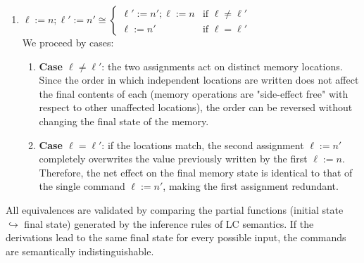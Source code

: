 \begin{solution}
\begin{enumerate}[label=(\alph*)]
    \begin{enumerate}[label=(\alph{enumi}).\arabic*]
        \item \textbf{$B$ is evaluated to $false$}: the loop terminates immediately in state $s$ ($\langle \text{while } B \text{ do } C, s \rangle\Downarrow \langle skip,s\rangle$), by ($\Downarrow_{wh2}$). The corresponding $if$ statement evaluates the guard to $false$, executes the $else$ branch (which is $skip$), and also terminates in state $s$ ($\text{if } B \text { then } C; (\text{ while } B \text{ do } C) \text{ else } \text{ skip }, s \rangle\Downarrow \langle skip,s\rangle$), by ($\Downarrow_{if2}$).
        \item \textbf{$B$ is evaluated to $true$}: the loop executes the body $C$ to a state $s'$, then execute the entire loop again, i.e ($\langle \text{while } B \text{ do } C, s \rangle\Downarrow \langle skip,s''\rangle$ if and only if $\langle C,s\rangle \Downarrow s'$ and $\langle \text{while } B \text{ do } C, s' \rangle\Downarrow \langle skip,s''\rangle$).
        \\ On the other hand the \textit{if} statement evaluates the guard to $true$ executing command $C$ and the entire while loop, producing the exact same sequence of states. 
    \end{enumerate}
    \item $\ell:=n; \ell':=n' \cong \begin{cases}\ell':=n';  \ell:=n & \mbox{if } \ell \neq \ell' \\ \ell :=n' &  \mbox{if }  \ell = \ell'\end{cases}$
    \\ We proceed by cases: 
     \begin{enumerate}[label=(\alph{enumi}).\arabic*]
        \item \textbf{Case $\ell \neq \ell '$}: the two assignments act on distinct memory locations. Since the order in which independent locations are written does not affect the final contents of each (memory operations are "side-effect free" with respect to other unaffected locations), the order can be reversed without changing the final state of the memory.
        \item \textbf{Case $\ell = \ell '$}: if the locations match, the second assignment $\ell := n'$ completely overwrites the value previously written by the first $\ell := n$. Therefore, the net effect on the final memory state is identical to that of the single command $\ell := n'$, making the first assignment redundant.
    \end{enumerate}
\end{enumerate}
All equivalences are validated by comparing the partial functions (initial state $\hookrightarrow$ final state) generated by the inference rules of {\sffamily LC} semantics. If the derivations lead to the same final state for every possible input, the commands are semantically indistinguishable.
\end{solution}
